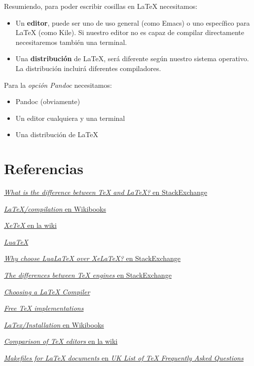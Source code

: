 Resumiendo, para poder escribir cosillas en LaTeX necesitamos:

\begin{itemize}
\item
  Un \textbf{editor}, puede ser uno de uso general (como Emacs) o uno
  específico para LaTeX (como Kile). Si nuestro editor no es capaz de
  compilar directamente necesitaremos también una terminal.
\item
  Una \textbf{distribución} de LaTeX, será diferente según nuestro
  sistema operativo. La distribución incluirá diferentes compiladores.
\end{itemize}

Para la \emph{opción Pandoc} necesitamos:

\begin{itemize}
\tightlist
\item
  Pandoc (obviamente)
\item
  Un editor cualquiera y una terminal
\item
  Una distribución de LaTeX
\end{itemize}

\section{Referencias}\label{referencias}

\href{http://tex.stackexchange.com/questions/49/what-is-the-difference-between-tex-and-latex}{\emph{What
is the difference between TeX and LaTeX?} en StackExchange}

\href{https://en.wikibooks.org/wiki/LaTeX/Basics\#Compilation}{\emph{LaTeX/compilation}
en Wikibooks}

\href{https://en.wikipedia.org/wiki/XeTeX}{\emph{XeTeX} en la wiki}

\href{http://www.luatex.org/}{\emph{LuaTeX}}

\href{http://tex.stackexchange.com/questions/126206/why-choose-lualatex-over-xelatex\#126216}{\emph{Why
choose LuaLaTeX over XeLaTeX?} en StackExchange}

\href{http://tex.stackexchange.com/questions/13593/the-differences-between-tex-engines\#13601}{\emph{The
differences between TeX engines} en StackExchange}

\href{https://www.sharelatex.com/learn/Choosing_a_LaTeX_Compiler}{\emph{Choosing
a LaTeX Compiler}}

\href{http://www.tug.org/interest.html\#free}{\emph{Free TeX
implementations}}

\href{https://en.wikibooks.org/wiki/LaTeX/Installation}{\emph{LaTex/Installation}
en Wikibooks}

\href{https://en.wikipedia.org/wiki/Comparison_of_TeX_editors}{\emph{Comparison
of TeX editors} en la wiki}

\href{http://www.tex.ac.uk/FAQ-make.html}{\emph{Makefiles for LaTeX
documents} en \emph{UK List of TeX Frequently Asked Questions}}
